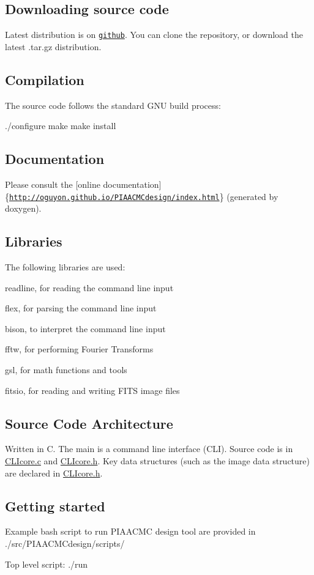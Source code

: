 \subsection*{Downloading source code}

Latest distribution is on \href{https://github.com/oguyon/PIAACMCdesign}{\tt github}. You can clone the repository, or download the latest .tar.\+gz distribution.

\subsection*{Compilation}

The source code follows the standard G\+N\+U build process\+: \begin{DoxyVerb}./configure
make
make install
\end{DoxyVerb}


\subsection*{Documentation}

Please consult the \mbox{[}online documentation\mbox{]}\{\href{http://oguyon.github.io/PIAACMCdesign/index.html}{\tt http\+://oguyon.\+github.\+io/\+P\+I\+A\+A\+C\+M\+Cdesign/index.\+html}\} (generated by doxygen).

\subsection*{Libraries}

The following libraries are used\+:
\begin{DoxyItemize}
\item readline, for reading the command line input
\item flex, for parsing the command line input
\item bison, to interpret the command line input
\item fftw, for performing Fourier Transforms
\item gsl, for math functions and tools
\item fitsio, for reading and writing F\+I\+T\+S image files
\end{DoxyItemize}

\subsection*{Source Code Architecture}

Written in C. The main is a command line interface (C\+L\+I). Source code is in \hyperlink{CLIcore_8c}{C\+L\+Icore.\+c} and \hyperlink{CLIcore_8h}{C\+L\+Icore.\+h}. Key data structures (such as the image data structure) are declared in \hyperlink{CLIcore_8h}{C\+L\+Icore.\+h}.

\subsection*{Getting started}

Example bash script to run P\+I\+A\+A\+C\+M\+C design tool are provided in ./src/\+P\+I\+A\+A\+C\+M\+Cdesign/scripts/

Top level script\+: ./run 